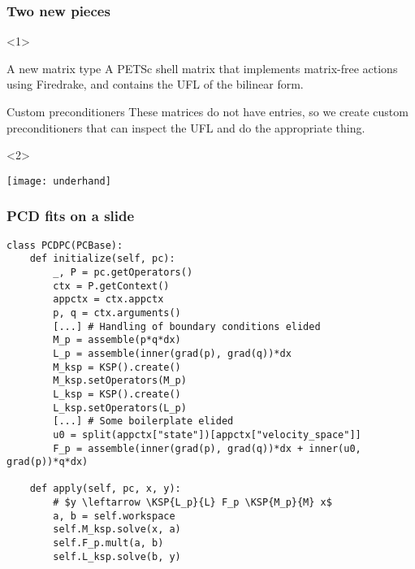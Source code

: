 \documentclass[presentation]{beamer}
\newcommand{\KSP}[2]{\ensuremath{\mathcal{K}\left(#1, \mathbb{#2}\right)}}
\begin{document}
\begin{frame}
  \frametitle{Two new pieces}
 
  \begin{onlyenv}<1>
    \begin{block}{A new matrix type}
      A PETSc shell matrix that implements matrix-free actions using
      Firedrake, and contains the UFL of the bilinear form.
    \end{block}
    
    \begin{block}{Custom preconditioners}
      These matrices do not have entries, so we create custom
      preconditioners that can inspect the UFL and do the appropriate
      thing.
    \end{block}
  \end{onlyenv}
  \begin{onlyenv}<2>
    \begin{center}
      \texttt{[image: underhand]}
    \end{center}
  \end{onlyenv}
\end{frame}

\begin{frame}[fragile]
  \frametitle{PCD fits on a slide}
\begin{verbatim}
class PCDPC(PCBase):
    def initialize(self, pc):
        _, P = pc.getOperators()
        ctx = P.getContext()
        appctx = ctx.appctx
        p, q = ctx.arguments()
        [...] # Handling of boundary conditions elided
        M_p = assemble(p*q*dx)
        L_p = assemble(inner(grad(p), grad(q))*dx
        M_ksp = KSP().create()
        M_ksp.setOperators(M_p)
        L_ksp = KSP().create()
        L_ksp.setOperators(L_p)
        [...] # Some boilerplate elided
        u0 = split(appctx["state"])[appctx["velocity_space"]]
        F_p = assemble(inner(grad(p), grad(q))*dx + inner(u0, grad(p))*q*dx)

    def apply(self, pc, x, y):
        # $y \leftarrow \KSP{L_p}{L} F_p \KSP{M_p}{M} x$
        a, b = self.workspace
        self.M_ksp.solve(x, a)
        self.F_p.mult(a, b)
        self.L_ksp.solve(b, y)
\end{verbatim}
\end{frame}
\end{document}
